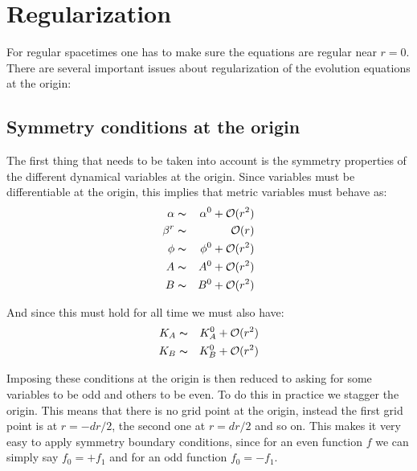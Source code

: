 \documentclass[12pt]{article}
\begin{document}
\vspace{3mm}



\setcounter{equation}{0}
\section{Regularization}
\label{sec:regularization}

For regular spacetimes one has to make sure the equations are regular
near $r=0$. There are several important issues about regularization of
the evolution equations at the origin: \\

\subsection{Symmetry conditions at the origin}

The first thing that needs to be taken into account is the symmetry
properties of the different dynamical variables at the origin.  Since
variables must be differentiable at the origin, this implies that
metric variables must behave as:
\begin{eqnarray}
\alpha &\thicksim& \alpha^0 + \mathcal{O}(r^2) \\
\beta^r &\thicksim& \mathcal{O}(r) \\
\phi &\thicksim& \phi^0 + \mathcal{O}(r^2) \\
A &\thicksim& A^0 + \mathcal{O}(r^2) \\
B &\thicksim& B^0 + \mathcal{O}(r^2)
\end{eqnarray}

And since this must hold for all time we must also have:
\begin{eqnarray}
K_A &\thicksim& K_A^0 + \mathcal{O}(r^2) \\
K_B &\thicksim& K_B^0 + \mathcal{O}(r^2)
\end{eqnarray}

Imposing these conditions at the origin is then reduced to asking for
some variables to be odd and others to be even. To do this in practice
we stagger the origin. This means that there is no grid point at the
origin, instead the first grid point is at $r=-dr/2$, the second one
at $r=dr/2$ and so on. This makes it very easy to apply symmetry
boundary conditions, since for an even function $f$ we can simply say
$f_0=+f_1$ and for an odd function $f_0=-f_1$. \\
\end{document}
